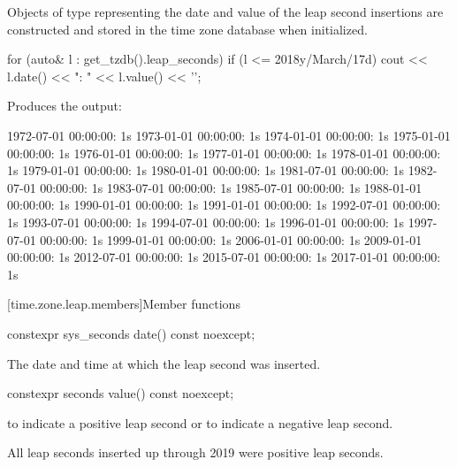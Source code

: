 \pnum
Objects of type  representing
the date and value of the leap second insertions
are constructed and stored in the time zone database when initialized.

\pnum
\begin{example}
\begin{codeblock}
for (auto& l : get_tzdb().leap_seconds)
  if (l <= 2018y/March/17d)
    cout << l.date() << ": " << l.value() << '\n';
\end{codeblock}

Produces the output:

\begin{outputblock}
1972-07-01 00:00:00: 1s
1973-01-01 00:00:00: 1s
1974-01-01 00:00:00: 1s
1975-01-01 00:00:00: 1s
1976-01-01 00:00:00: 1s
1977-01-01 00:00:00: 1s
1978-01-01 00:00:00: 1s
1979-01-01 00:00:00: 1s
1980-01-01 00:00:00: 1s
1981-07-01 00:00:00: 1s
1982-07-01 00:00:00: 1s
1983-07-01 00:00:00: 1s
1985-07-01 00:00:00: 1s
1988-01-01 00:00:00: 1s
1990-01-01 00:00:00: 1s
1991-01-01 00:00:00: 1s
1992-07-01 00:00:00: 1s
1993-07-01 00:00:00: 1s
1994-07-01 00:00:00: 1s
1996-01-01 00:00:00: 1s
1997-07-01 00:00:00: 1s
1999-01-01 00:00:00: 1s
2006-01-01 00:00:00: 1s
2009-01-01 00:00:00: 1s
2012-07-01 00:00:00: 1s
2015-07-01 00:00:00: 1s
2017-01-01 00:00:00: 1s
\end{outputblock}
\end{example}

[time.zone.leap.members]{Member functions}

%
\begin{itemdecl}
constexpr sys_seconds date() const noexcept;
\end{itemdecl}

\begin{itemdescr}
\pnum
\returns
The date and time at which the leap second was inserted.
\end{itemdescr}

%
\begin{itemdecl}
constexpr seconds value() const noexcept;
\end{itemdecl}

\begin{itemdescr}
\pnum
\returns
{} to indicate a positive leap second or
 to indicate a negative leap second.
\begin{note}
All leap seconds inserted up through 2019 were positive leap seconds.
\end{note}
\end{itemdescr}

